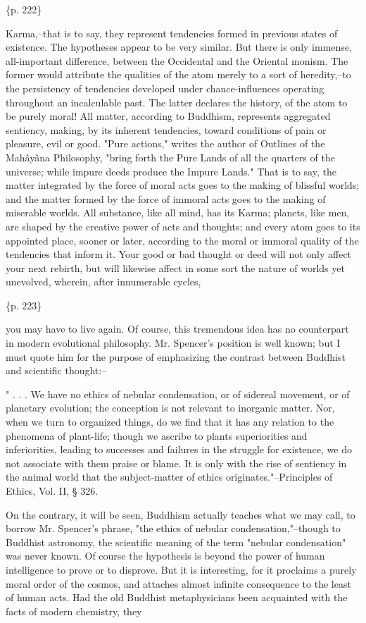 \{p. 222\}

Karma,--that is to say, they represent tendencies formed in previous states of existence. The hypotheses appear to be very similar. But there is only immense, all-important difference, between the Occidental and the Oriental monism. The former would attribute the qualities of the atom merely to a sort of heredity,--to the persistency of tendencies developed under chance-influences operating throughout an incalculable past. The latter declares the history, of the atom to be purely moral! All matter, according to Buddhism, represents aggregated sentiency, making, by its inherent tendencies, toward conditions of pain or pleasure, evil or good. "Pure actions," writes the author of Outlines of the Mahâyâna Philosophy, "bring forth the Pure Lands of all the quarters of the universe; while impure deeds produce the Impure Lands." That is to say, the matter integrated by the force of moral acts goes to the making of blissful worlds; and the matter formed by the force of immoral acts goes to the making of miserable worlds. All substance, like all mind, has its Karma; planets, like men, are shaped by the creative power of acts and thoughts; and every atom goes to its appointed place, sooner or later, according to the moral or immoral quality of the tendencies that inform it. Your good or bad thought or deed will not only affect your next rebirth, but will likewise affect in some sort the nature of worlds yet unevolved, wherein, after innumerable cycles,

\{p. 223\}

you may have to live again. Of course, this tremendous idea has no counterpart in modern evolutional philosophy. Mr. Spencer's position is well known; but I must quote him for the purpose of emphasizing the contrast between Buddhist and scientific thought:--

" . . . We have no ethics of nebular condensation, or of sidereal movement, or of planetary evolution; the conception is not relevant to inorganic matter. Nor, when we turn to organized things, do we find that it has any relation to the phenomena of plant-life; though we ascribe to plants superiorities and inferiorities, leading to successes and failures in the struggle for existence, we do not associate with them praise or blame. It is only with the rise of sentiency in the animal world that the subject-matter of ethics originates."--Principles of Ethics, Vol. II, § 326.

On the contrary, it will be seen, Buddhism actually teaches what we may call, to borrow Mr. Spencer's phrase, "the ethics of nebular condensation,"--though to Buddhist astronomy, the scientific meaning of the term "nebular condensation" was never known. Of course the hypothesis is beyond the power of human intelligence to prove or to disprove. But it is interesting, for it proclaims a purely moral order of the cosmos, and attaches almost infinite consequence to the least of human acts. Had the old Buddhist metaphysicians been acquainted with the facts of modern chemistry, they


